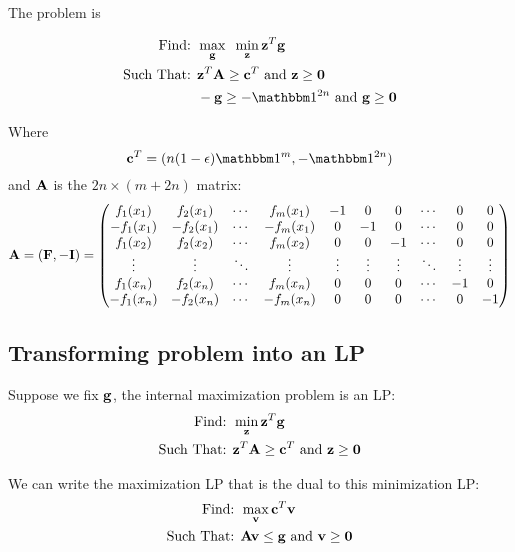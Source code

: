 \documentclass{article}[12pt]
\begin{document}
The problem is

\begin{eqnarray}
\mbox{Find: }&\max_{\vg} \;\; \min_{\vz} \vz^T \vg \label{max-min-prog}\\
\mbox{Such That: }& \vz^T \vA \geq \vc^T \mbox{ and } \vz \geq \vzero
\notag \\
& -\vg \geq -\ones{2n} \mbox{ and } \vg \geq \vzero \notag
\end{eqnarray}

Where 
\begin{equation}
\vc^T = (n (1-\epsilon) \ones{m}, -\ones{2n})
\end{equation}
and $\mathbf{A}$ is the  $2n \times (m+2n)$ matrix: 
\begin{equation}
\mathbf{A} = \left( \mathbf{F}, -\mathbf{I} \right) =
 \begin{pmatrix}
   f_1(x_1) &  f_2(x_1) & \cdots &  f_m(x_1) & -1 & 0 & 0 & \cdots & 0
   & 0 \\
  -f_1(x_1) & -f_2(x_1) & \cdots & -f_m(x_1) & 0 & -1 & 0 & \cdots & 0
  & 0 \\
   f_1(x_2) &  f_2(x_2) & \cdots &  f_m(x_2) & 0 & 0 & -1 & \cdots & 0
   & 0 \\
  \vdots   & \vdots    & \ddots &  \vdots  & \vdots & \vdots & \vdots
  & \ddots & \vdots & \vdots \\
   f_1(x_n)  &  f_2(x_n)  & \cdots &   f_m(x_n) & 0  & 0 & 0 & \cdots
   & -1 & 0 \\
  -f_1(x_n)  & -f_2(x_n)  & \cdots &  -f_m(x_n) & 0  & 0 & 0 & \cdots
  & 0 & -1 \\
 \end{pmatrix}
\end{equation}

\subsection{Transforming problem into an LP}

Suppose we fix $\mathbf{g}$, the internal maximization problem is an LP:
\begin{eqnarray}
\mbox{Find: }&\min_{\mathbf{z}} \mathbf{z}^T \mathbf{g} \label{min-LP}\\
\mbox{Such That: }& \mathbf{z}^T \mathbf{A} \geq \mathbf{c}^T \mbox{ and } \mathbf{z} \geq \mathbf{0} \notag
\end{eqnarray}

We can write the maximization LP that is the dual to this minimization LP:
\begin{eqnarray}
\mbox{Find: }& \max_{\mathbf{v}} \mathbf{c}^T \mathbf{v} \label{max-LP}\\
\mbox{Such That: }& \mathbf{A} \mathbf{v} \leq \mathbf{g} \mbox{ and } \mathbf{v} \geq \mathbf{0} \notag
\end{eqnarray}
\end{document}
